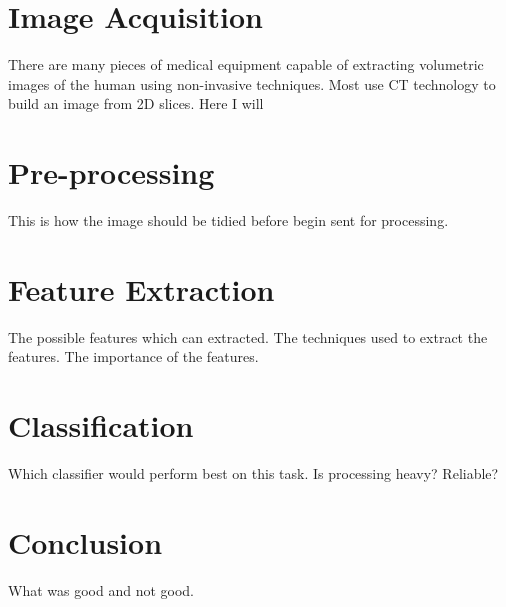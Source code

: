 \documentclass[journal]{IEEEtran}
\begin{document}
\section{Image Acquisition}
\label{sec:ImageAcquisition}
There are many pieces of medical equipment capable of extracting volumetric images of the human using non-invasive techniques.
Most use CT technology to build an image from 2D slices.
Here I will 




\section{Pre-processing}
\label{sec:PreProcessing}
This is how the image should be tidied before begin sent for processing.






\section{Feature Extraction}
\label{FeatureExtraction}

The possible features which can extracted.
The techniques used to extract the features.
The importance of the features.




\section{Classification}
\label{Classification}


Which classifier would perform best on this task.
Is processing heavy? Reliable?






\section{Conclusion}
\label{Conclusion}

What was good and not good.
\end{document}
